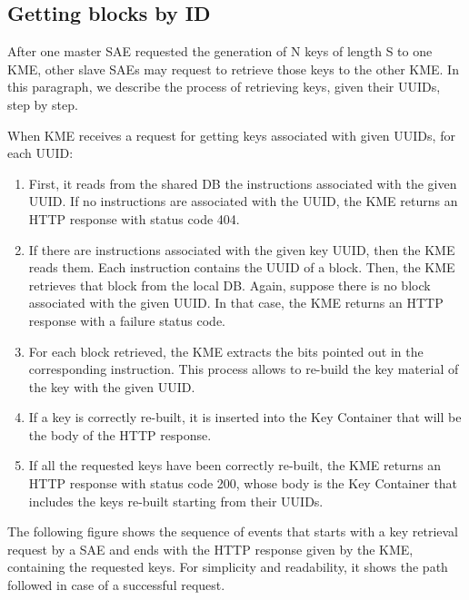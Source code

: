 \subsection{Getting blocks by ID}
After one master SAE requested the generation of N keys of length S to one KME, other slave SAEs may request to retrieve those keys to the other KME. In this paragraph, we describe the process of retrieving keys, given their UUIDs, step by step.

When KME receives a request for getting keys associated with given UUIDs, for each UUID:

\begin{enumerate}
    \item First, it reads from the shared DB the instructions associated with the given UUID. If no instructions are associated with the UUID, the KME returns an HTTP response with status code 404.
    \item If there are instructions associated with the given key UUID, then the KME reads them. Each instruction contains the UUID of a block. Then, the KME retrieves that block from the local DB. Again, suppose there is no block associated with the given UUID. In that case, the KME returns an HTTP response with a failure status code.
    \item For each block retrieved, the KME extracts the bits pointed out in the corresponding instruction. This process allows to re-build the key material of the key with the given UUID.
    \item If a key is correctly re-built, it is inserted into the Key Container that will be the body of the HTTP response.
    \item If all the requested keys have been correctly re-built, the KME returns an HTTP response with status code 200, whose body is the Key Container that includes the keys re-built starting from their UUIDs.
\end{enumerate}

The following figure shows the sequence of events that starts with a key retrieval request by a SAE and ends with the HTTP response given by the KME, containing the requested keys. For simplicity and readability, it shows the path followed in case of a successful request.

